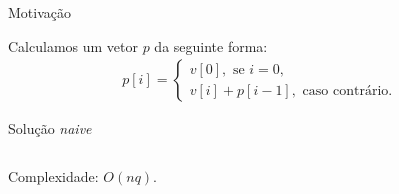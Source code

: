 \begin{frame}{Motivação}

    Calculamos um vetor $p$ da seguinte forma:
    \begin{gather}
        p[i] = \begin{cases}
            v[0], \text{ se } i = 0, \\
            v[i] + p[i-1], \text{ caso contrário.}
        \end{cases}
    \end{gather}



    \begin{block}{Solução \textit{naive}}
        \footnotesize
        \inputminted{cpp}{codigos/naive.cpp}    
    \end{block}

    Complexidade: $O(nq)$.
\end{frame}


